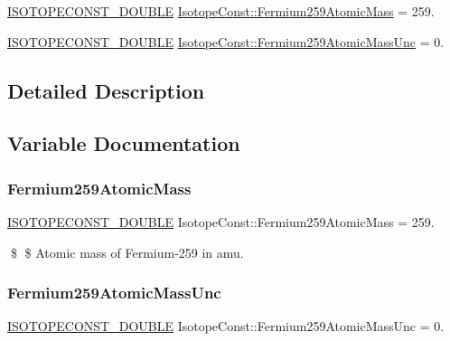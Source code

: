 \begin{DoxyCompactItemize}
\item 
\mbox{\hyperlink{group___isotope_const-_macros_ga8f45a7272ce02c0b4c65c44636ed719a}{I\+S\+O\+T\+O\+P\+E\+C\+O\+N\+S\+T\+\_\+\+D\+O\+U\+B\+LE}} \mbox{\hyperlink{group___isotope_const-_fermium-_fm259_ga2f63b1c9a5ca794bebe77d3ae89cbf9b}{Isotope\+Const\+::\+Fermium259\+Atomic\+Mass}} = 259.
\item 
\mbox{\hyperlink{group___isotope_const-_macros_ga8f45a7272ce02c0b4c65c44636ed719a}{I\+S\+O\+T\+O\+P\+E\+C\+O\+N\+S\+T\+\_\+\+D\+O\+U\+B\+LE}} \mbox{\hyperlink{group___isotope_const-_fermium-_fm259_ga871cfaf7e0817fcf89e9e61b669990c3}{Isotope\+Const\+::\+Fermium259\+Atomic\+Mass\+Unc}} = 0.
\end{DoxyCompactItemize}


\subsection{Detailed Description}


\subsection{Variable Documentation}
\mbox{\label{group___isotope_const-_fermium-_fm259_ga2f63b1c9a5ca794bebe77d3ae89cbf9b}} 
\subsubsection{\texorpdfstring{Fermium259\+Atomic\+Mass}{Fermium259AtomicMass}}
{\footnotesize\ttfamily \mbox{\hyperlink{group___isotope_const-_macros_ga8f45a7272ce02c0b4c65c44636ed719a}{I\+S\+O\+T\+O\+P\+E\+C\+O\+N\+S\+T\+\_\+\+D\+O\+U\+B\+LE}} Isotope\+Const\+::\+Fermium259\+Atomic\+Mass = 259.}

\$ \$ Atomic mass of Fermium-\/259 in amu. \mbox{\label{group___isotope_const-_fermium-_fm259_ga871cfaf7e0817fcf89e9e61b669990c3}} 
\subsubsection{\texorpdfstring{Fermium259\+Atomic\+Mass\+Unc}{Fermium259AtomicMassUnc}}
{\footnotesize\ttfamily \mbox{\hyperlink{group___isotope_const-_macros_ga8f45a7272ce02c0b4c65c44636ed719a}{I\+S\+O\+T\+O\+P\+E\+C\+O\+N\+S\+T\+\_\+\+D\+O\+U\+B\+LE}} Isotope\+Const\+::\+Fermium259\+Atomic\+Mass\+Unc = 0.}

